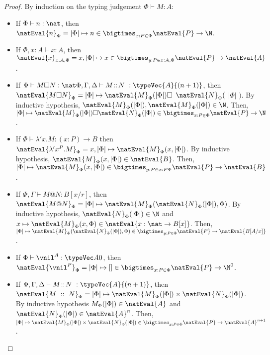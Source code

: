 \begin{proof}
    By induction on the typing judgement $\Phi \vdash M : A$:
    \begin{itemize}
        \item If $\Phi\vdash n:\nat$, then $\natEval{n}_\Phi = |\Phi| \mapsto n \in  \bigtimes_{x:P \in \Phi} \natEval{P} \to \N$.

        \item If $\Phi, x:A\vdash x:A$, then $\natEval{x}_{x:A, \Phi} = x,|\Phi| \mapsto x \in \bigtimes_{y:P \in x:A,\Phi} \natEval{P} \to \natEval{A}$.

        \item If $\Phi\vdash M\square N:\nat\Phi,\Gamma,\Delta\vdash M\!::\!N\ :\typeVec{A}{(n+1)}$, then $\natEval{M \square N}_\Phi = |\Phi| \mapsto \natEval{M}_\Phi(|\Phi|) \square$
        $\natEval{N}_\Phi($ $|\Phi|$ $)$. By inductive hypothesis, $\natEval{M}_\Phi(|\Phi|), \natEval{M}_\Phi(|\Phi|)\in \N$. Then,
        $|\Phi| \mapsto \natEval{M}_\Phi(|\Phi|) \square \natEval{N}_\Phi(|\Phi|)\in \bigtimes_{x:P \in \Phi} \natEval{P} \to \N$.
        
        \item If $\Phi\vdash\lambda' x.M:(x:P)\to B$ then $\natEval{\lambda' x^P.M}_\Phi = x,|\Phi| \mapsto \natEval{M}_\Phi(x,|\Phi|)$. By inductive hypothesis, $\natEval{M}_\Phi(x,|\Phi|)\in \natEval{B}$. Then, $|\Phi| \mapsto \natEval{M}_\Phi(x,|\Phi|)\in \bigtimes_{y:P \in x:P\Phi} \natEval{P} \to \natEval{B}$.

        \item If $\Phi,\Gamma\vdash M @ N:B[x/r]$, then $\natEval{M @ N}_\Phi = |\Phi| \mapsto\natEval{M}_\Phi(\natEval{N}_\Phi(|\Phi|), \Phi)$. By inductive hypothesis, $\natEval{N}_\Phi(|\Phi|)\in \N$ and $x\mapsto\natEval{M}_\Phi(x, \Phi)\in \natEval{x:\nat\to B[x]}$. Then, $|\Phi|\mapsto\natEval{M}_\Phi(\natEval{N}_\Phi(|\Phi|), \Phi) \in \bigtimes_{y:P \in \Phi} \natEval{P} \to \natEval{B[A/x]}$.

        \item If $\Phi\vdash \vnil^A:\typeVec A 0$, then $\natEval{\vnil^P}_{\Phi} = |\Phi| \mapsto []\in \bigtimes_{x:P \in \Phi} \natEval{P} \to \N^0$.

        \item If $\Phi,\Gamma,\Delta\vdash M\!::\!N\ :\typeVec{A}{(n+1)}$, then $\natEval{M\ ::\ N}_{\Phi} = |\Phi| \mapsto \natEval{M}_\Phi(|\Phi|) \times \natEval{N}_\Phi(|\Phi|)$. By inductive hypothesis ${M}_\Phi(|\Phi|)\in\natEval{A}$ and $\natEval{N}_\Phi(|\Phi|)\in\natEval{A}^n$. Then, $|\Phi| \mapsto \natEval{M}_\Phi(|\Phi|) \times \natEval{N}_\Phi(|\Phi|)\in\bigtimes_{x:P \in \Phi} \natEval{P} \to \natEval{A}^{n+1}$.


\end{itemize}
\end{proof}
